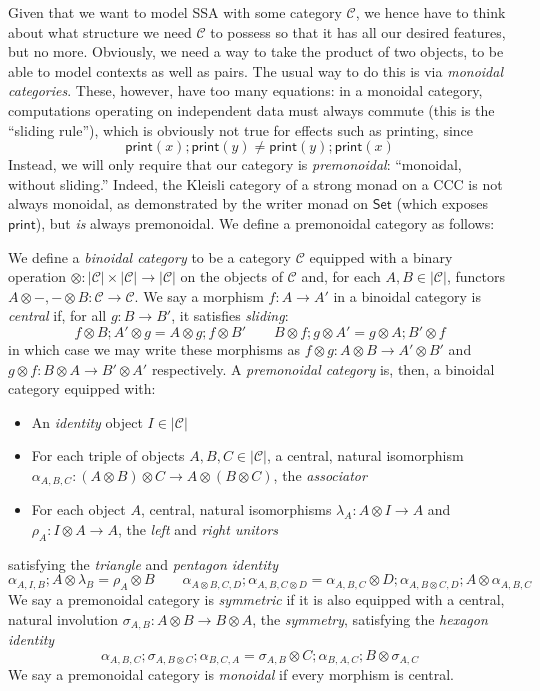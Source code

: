 \documentclass[acmsmall,screen,review]{acmart}
\newcommand{\mc}[1]{\ensuremath{\mathcal{#1}}}
\newcommand{\ms}[1]{\ensuremath{\mathsf{#1}}}
\begin{document}
Given that we want to model SSA with some category $\mc{C}$, we hence have to think about what
structure we need $\mc{C}$ to possess so that it has all our desired features, but no more.
Obviously, we need a way to take the product of two objects, to be able to model contexts as well as
pairs. The usual way to do this is via \emph{monoidal categories}. These, however, have too many
equations: in a monoidal category, computations operating on independent data must always commute
(this is the ``sliding rule''), which is obviously not true for effects such as printing, since
$$
\ms{print}(x) ; \ms{print}(y) \neq \ms{print}(y) ; \ms{print}(x)
$$
Instead, we will only require that our category is \emph{premonoidal}: ``monoidal, without
sliding.'' Indeed, the Kleisli category of a strong monad on a CCC is not always monoidal, as
demonstrated by the writer monad on $\ms{Set}$ (which exposes $\ms{print}$), but \emph{is} always
premonoidal. We define a premonoidal category as follows:
\begin{definition}
  We define a \emph{binoidal category} to be a category $\mc{C}$ equipped with a binary operation
  $\otimes : |\mc{C}| \times |\mc{C}| \to |\mc{C}|$ on the objects of $\mc{C}$ and, for each $A, B
  \in |\mc{C}|$, functors $A \otimes -, - \otimes B : \mc{C} \to \mc{C}$. We say a morphism $f : A
  \to A'$ in a binoidal category is \emph{central} if, for all $g : B \to B'$, it satisfies
  \emph{sliding}:
  $$
  f \otimes B ; A' \otimes g = A \otimes g ; f \otimes B' \qquad
  B \otimes f ; g \otimes A' = g \otimes A ; B' \otimes f
  $$
  in which case we may write these morphisms as $f \otimes g : A \otimes B \to A' \otimes B'$ and $g
  \otimes f : B \otimes A \to B' \otimes A'$ respectively. A \emph{premonoidal category} is, then, a
  binoidal category equipped with:
  \begin{itemize}
    \item An \emph{identity} object $I \in |\mc{C}|$
    \item For each triple of objects $A, B, C \in |\mc{C}|$, a central, natural isomorphism
    $\alpha_{A, B, C} : (A \otimes B) \otimes C \to A \otimes (B \otimes C)$, the \emph{associator}
    \item For each object $A$, central, natural isomorphisms $\lambda_A : A \otimes I \to A$ and
    $\rho_A : I \otimes A \to A$, the \emph{left} and \emph{right unitors}
  \end{itemize}
  satisfying the \emph{triangle} and \emph{pentagon identity}
  $$
  \alpha_{A, I, B} ; A \otimes \lambda_B = \rho_A \otimes B \qquad
  \alpha_{A \otimes B, C, D} ; \alpha_{A, B, C \otimes D}
  = \alpha_{A, B, C} \otimes D ; \alpha_{A, B \otimes C, D} ; A \otimes \alpha_{A, B, C}
  $$
  We say a premonoidal category is \emph{symmetric} if it is also equipped with a central, natural
  involution $\sigma_{A, B} : A \otimes B \to B \otimes A$, the \textit{symmetry}, satisfying the
  \emph{hexagon identity}
  $$
  \alpha_{A, B, C} ; \sigma_{A, B \otimes C} ; \alpha_{B, C, A}
  = \sigma_{A, B} \otimes C ; \alpha_{B, A, C} ; B \otimes \sigma_{A, C}
  $$
  We say a premonoidal category is \emph{monoidal} if every morphism is central.
\end{definition}
\end{document}
